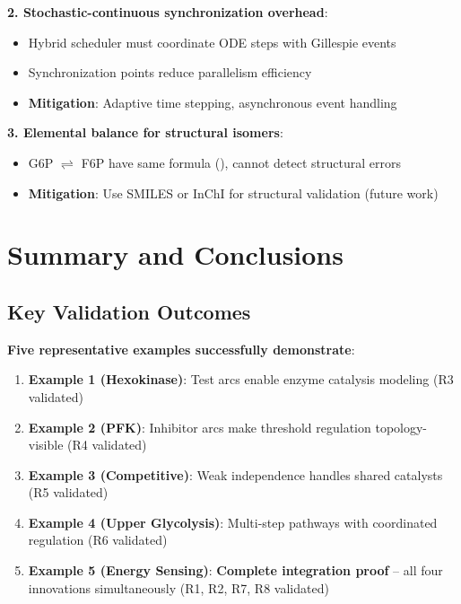 \textbf{2. Stochastic-continuous synchronization overhead}:

\begin{itemize}
    \item Hybrid scheduler must coordinate ODE steps with Gillespie events
    \item Synchronization points reduce parallelism efficiency
    \item \textbf{Mitigation}: Adaptive time stepping, asynchronous event handling
\end{itemize}

\textbf{3. Elemental balance for structural isomers}:

\begin{itemize}
    \item G6P $\rightleftharpoons$ F6P have same formula (), cannot detect structural errors
    \item \textbf{Mitigation}: Use SMILES or InChI for structural validation (future work)
\end{itemize}

\section{Summary and Conclusions}
\label{sec:validation-summary}

\subsection{Key Validation Outcomes}
\label{subsec:validation-outcomes}

\textbf{Five representative examples successfully demonstrate}:

\begin{enumerate}
    \item \textbf{Example 1 (Hexokinase)}: Test arcs enable enzyme catalysis modeling (R3 validated)
    \item \textbf{Example 2 (PFK)}: Inhibitor arcs make threshold regulation topology-visible (R4 validated)
    \item \textbf{Example 3 (Competitive)}: Weak independence handles shared catalysts (R5 validated)
    \item \textbf{Example 4 (Upper Glycolysis)}: Multi-step pathways with coordinated regulation (R6 validated)
    \item \textbf{Example 5 (Energy Sensing)}: \textbf{Complete integration proof} -- all four innovations simultaneously (R1, R2, R7, R8 validated)
\end{enumerate}

